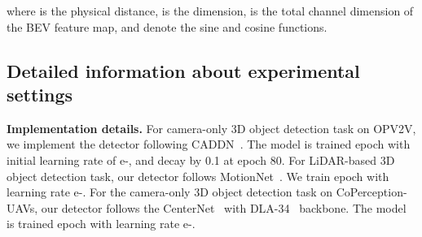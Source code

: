 \documentclass{article}
\begin{document}
where  is the physical distance,  is the dimension,  is the total channel dimension of the BEV feature map,  and  denote the sine and cosine functions.

\subsection{Detailed information about experimental settings}
\textbf{Implementation details.} For camera-only 3D object detection task on OPV2V, we implement the detector following CADDN~\cite{CaDDN}. The model is trained  epoch with initial learning rate of e-, and decay by 0.1 at epoch 80. For LiDAR-based 3D object detection task, our detector follows MotionNet~\cite{Wu2020MotionNetJP}. We train  epoch with learning rate e-. For the camera-only 3D object detection task on CoPerception-UAVs, our detector follows the CenterNet~\cite{zhou2019objects} with DLA-34~\cite{yu2018dla} backbone. The model is trained  epoch with learning rate e-. 
\end{document}
